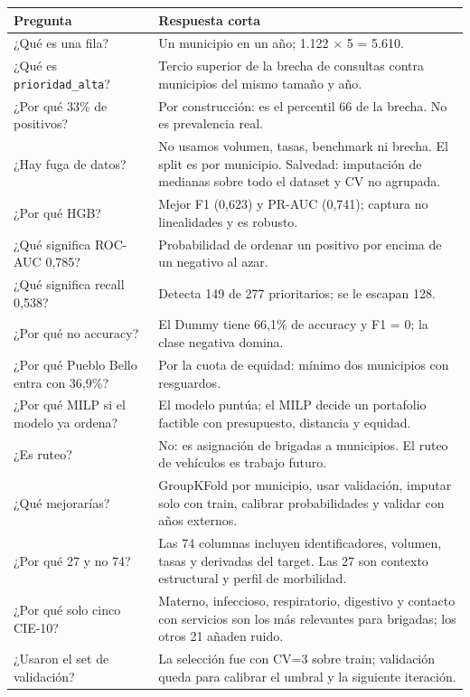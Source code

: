 \documentclass[11pt,a4paper]{article}
\newcommand{\code}[1]{\texttt{#1}}
\begin{document}
\begin{longtable}{@{}L{5.95cm} L{10.05cm}@{}}
\toprule
\textbf{Pregunta} & \textbf{Respuesta corta} \\
\midrule
\endhead
¿Qué es una fila? &
Un municipio en un año; 1.122 $\times$ 5 = 5.610. \\
¿Qué es \code{prioridad_alta}? &
Tercio superior de la brecha de consultas contra municipios del mismo tamaño y año. \\
¿Por qué 33\% de positivos? &
Por construcción: es el percentil 66 de la brecha. No es prevalencia real. \\
¿Hay fuga de datos? &
No usamos volumen, tasas, benchmark ni brecha. El split es por municipio. Salvedad: imputación de medianas sobre todo el dataset y CV no agrupada. \\
¿Por qué HGB? &
Mejor F1 (0,623) y PR-AUC (0,741); captura no linealidades y es robusto. \\
¿Qué significa ROC-AUC 0,785? &
Probabilidad de ordenar un positivo por encima de un negativo al azar. \\
¿Qué significa recall 0,538? &
Detecta 149 de 277 prioritarios; se le escapan 128. \\
¿Por qué no accuracy? &
El Dummy tiene 66,1\% de accuracy y F1 = 0; la clase negativa domina. \\
¿Por qué Pueblo Bello entra con 36,9\%? &
Por la cuota de equidad: mínimo dos municipios con resguardos. \\
¿Por qué MILP si el modelo ya ordena? &
El modelo puntúa; el MILP decide un portafolio factible con presupuesto, distancia y equidad. \\
¿Es ruteo? &
No: es asignación de brigadas a municipios. El ruteo de vehículos es trabajo futuro. \\
¿Qué mejorarías? &
GroupKFold por municipio, usar validación, imputar solo con train, calibrar probabilidades y validar con años externos. \\
¿Por qué 27 y no 74? &
Las 74 columnas incluyen identificadores, volumen, tasas y derivadas del target. Las 27 son contexto estructural y perfil de morbilidad. \\
¿Por qué solo cinco CIE-10? &
Materno, infeccioso, respiratorio, digestivo y contacto con servicios son los más relevantes para brigadas; los otros 21 añaden ruido. \\
¿Usaron el set de validación? &
La selección fue con CV=3 sobre train; validación queda para calibrar el umbral y la siguiente iteración. \\

\end{longtable}
\end{document}
